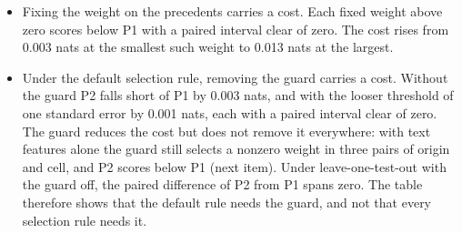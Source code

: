 \begin{itemize}
\item Fixing the weight on the precedents carries a cost. Each fixed weight above zero scores below P1 with a paired interval clear of zero. The cost rises from 0.003 nats at the smallest such weight to 0.013 nats at the largest.
\item Under the default selection rule, removing the guard carries a cost. Without the guard P2 falls short of P1 by 0.003 nats, and with the looser threshold of one standard error by 0.001 nats, each with a paired interval clear of zero. The guard reduces the cost but does not remove it everywhere: with text features alone the guard still selects a nonzero weight in three pairs of origin and cell, and P2 scores below P1 (next item). Under leave-one-test-out with the guard off, the paired difference of P2 from P1 spans zero. The table therefore shows that the default rule needs the guard, and not that every selection rule needs it.

\end{itemize}
